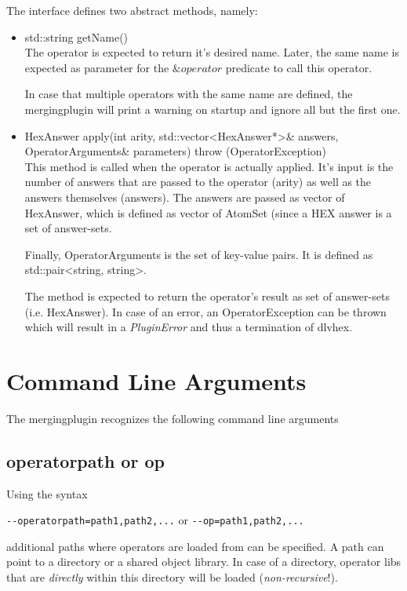 \documentclass[a4paper,11pt]{article}
\theoremstyle{definition}
\newcommand{\hex}{\textsf{HEX}\xspace }
\newcommand{\dlvhex}{\textsf{dlvhex}\xspace }
\newcommand{\inlinecode}[1]{\textsf{#1}\xspace }
\begin{document}
		The interface defines two abstract methods, namely:
		\begin{itemize}
			\item \inlinecode{std::string getName()} \\
					The operator is expected to return it's desired name. Later, the same name is expected as parameter for the $\mathit{\&operator}$ predicate to call this operator.
					
					In case that multiple operators with the same name are defined, the mergingplugin will print a warning on startup and ignore all but the first one.
			\item \inlinecode{HexAnswer apply(int arity, std::vector\textless HexAnswer*\textgreater \& answers, OperatorArguments\& parameters) throw (OperatorException)} \\
					This method is called when the operator is actually applied. It's input is the number of answers that are passed to the operator (arity) as well as the answers
					themselves (answers). The answers are passed as vector of \inlinecode{HexAnswer}, which is defined as vector of \inlinecode{AtomSet} (since a \hex answer is a
					set of answer-sets.
					
					Finally, \inlinecode{OperatorArguments} is the set of key-value pairs. It is defined as \inlinecode{std::pair\textless string, string\textgreater}.
					
					The method is expected to return the operator's result as set of answer-sets (i.e. \inlinecode{HexAnswer}). In case of an error, an \inlinecode{OperatorException}
					can be thrown which will result in a \emph{PluginError} and thus a termination of \dlvhex.
		\end{itemize}

		
	\section{Command Line Arguments}
	\label{sec:Arguments}
	
		The mergingplugin recognizes the following command line arguments

		
		\subsection{\inlinecode{operatorpath} or \inlinecode{op}}
		
			Using the syntax
			\begin{center}
				\verb+--operatorpath=path1,path2,...+ or \verb+--op=path1,path2,...+
			\end{center}
			additional paths where operators are loaded from can be specified. A path can point to a directory or a shared object library. In case of a directory, operator libs
			that are \emph{directly} within this directory will be loaded (\emph{non-recursive}!).
\end{document}
